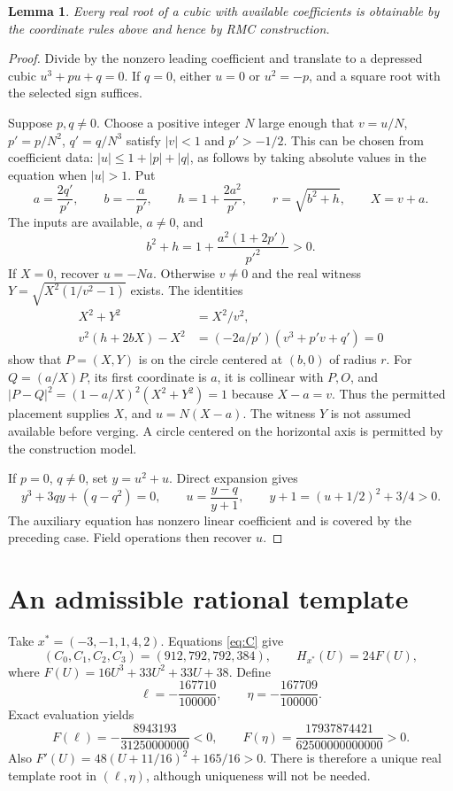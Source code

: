 \documentclass[noproofs]{rmj-public}
\newtheorem{lemma}[thm]{Lemma}
\theoremstyle{definition}
\numberwithin{equation}{section}
\begin{document}
\begin{lemma}\label{lem:cubic}
Every real root of a cubic with available coefficients is obtainable by
the coordinate rules above and hence by RMC construction.
\end{lemma}
\begin{proof}
Divide by the nonzero leading coefficient and translate to a depressed
cubic $u^3+pu+q=0$. If $q=0$, either $u=0$ or $u^2=-p$, and a square
root with the selected sign suffices.

Suppose $p,q\ne0$. Choose a positive integer $N$ large enough that
$v=u/N$, $p'=p/N^2$, $q'=q/N^3$ satisfy $|v|<1$ and $p'>-1/2$.
This can be chosen from coefficient data: $|u|\le1+|p|+|q|$, as follows
by taking absolute values in the equation when $|u|>1$. Put
\[
a=\frac{2q'}{p'},\qquad b=-\frac a{p'},\qquad
h=1+\frac{2a^2}{p'},\qquad r=\sqrt{b^2+h},\qquad X=v+a.
\]
The inputs are available, $a\ne0$, and
\[
b^2+h=1+\frac{a^2(1+2p')}{p'^2}>0.
\]
If $X=0$, recover $u=-Na$. Otherwise $v\ne0$ and the real witness
$Y=\sqrt{X^2(1/v^2-1)}$ exists. The identities
\begin{align*}
X^2+Y^2&=X^2/v^2,\\
v^2(h+2bX)-X^2&=(-2a/p')(v^3+p'v+q')=0
\end{align*}
show that $P=(X,Y)$ is on the circle centered at $(b,0)$ of radius $r$.
For $Q=(a/X)P$, its first coordinate is $a$, it is collinear with $P,O$,
and $|P-Q|^2=(1-a/X)^2(X^2+Y^2)=1$ because $X-a=v$. Thus the
permitted placement supplies $X$, and $u=N(X-a)$. The witness $Y$
is not assumed available before verging. A circle centered on the
horizontal axis is permitted by the construction model.

If $p=0$, $q\ne0$, set $y=u^2+u$. Direct expansion gives
\[
y^3+3qy+(q-q^2)=0,\qquad
u=\frac{y-q}{y+1},\qquad y+1=(u+1/2)^2+3/4>0.
\]
The auxiliary equation has nonzero linear coefficient and is covered by
the preceding case. Field operations then recover $u$.
\end{proof}

\section{An admissible rational template}\label{sec:template}

Take $x^*=(-3,-1,1,4,2)$. Equations \eqref{eq:C} give
\[
(C_0,C_1,C_2,C_3)=(912,792,792,384),\qquad
H_{x^*}(U)=24F(U),
\]
where $F(U)=16U^3+33U^2+33U+38$. Define
\[
\ell=-\frac{167710}{100000},\qquad
\eta=-\frac{167709}{100000}.
\]
Exact evaluation yields
\[
F(\ell)=-\frac{8943193}{31250000000}<0,
\qquad F(\eta)=\frac{17937874421}{62500000000000}>0.
\]
Also $F'(U)=48(U+11/16)^2+165/16>0$. There is therefore a unique real
template root in $(\ell,\eta)$, although uniqueness will not be needed.
\end{document}
